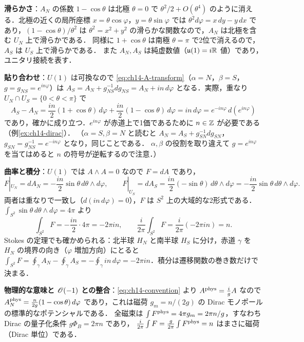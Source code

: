 \textbf{滑らかさ}：$A_N$ の係数 $1-\cos\theta$ は北極 $\theta=0$ で $\theta^2/2+O(\theta^4)$ のように消える．北極の近くの局所座標 $x=\theta\cos\varphi$，$y=\theta\sin\varphi$ では
$\theta^2d\varphi=x\,dy-y\,dx$ であり，$(1-\cos\theta)/\theta^2$ は $\theta^2=x^2+y^2$ の滑らかな関数なので，$A_N$ は北極を含む $U_N$ 上で滑らかである．
同様に $1+\cos\theta$ は南極 $\theta=\pi$ で2位で消えるので，$A_S$ は $U_S$ 上で滑らかである．
また $A_N,A_S$ は純虚数値（$\mathfrak{u}(1)=i\mathbb{R}$ 値）であり，ユニタリ接続を表す．

\textbf{貼り合わせ}：$U(1)$ は可換なので \eqref{eq:ch14-A-transform}（$\alpha=N$，$\beta=S$，$g=g_{NS}=e^{in\varphi}$）は
$A_S=A_N+g_{NS}^{-1}dg_{NS}=A_N+in\,d\varphi$ となる．実際，重なり $U_N\cap U_S=\{0<\theta<\pi\}$ で
\begin{equation*}
  A_S - A_N = \frac{in}{2}(1+\cos\theta)\,d\varphi + \frac{in}{2}(1-\cos\theta)\,d\varphi = in\,d\varphi = e^{-in\varphi}\,d(e^{in\varphi})
\end{equation*}
であり，確かに成り立つ．$e^{in\varphi}$ が赤道上で1価であるために $n\in\mathbb{Z}$ が必要である（例\ref{ex:ch14-dirac}）．
（$\alpha=S,\beta=N$ と読むと $A_N=A_S+g_{SN}^{-1}dg_{SN}$，$g_{SN}=g_{NS}^{-1}=e^{-in\varphi}$ となり，同じことである．
$\alpha,\beta$ の役割を取り違えて $g=e^{in\varphi}$ を当てはめると $n$ の符号が逆転するので注意．）

\textbf{曲率と積分}：$U(1)$ では $A\wedge A=0$ なので $F=dA$ であり，
\begin{equation*}
  F|_{U_N}=dA_N = -\frac{in}{2}\sin\theta\,d\theta\wedge d\varphi,\qquad
  F|_{U_S}=dA_S = \frac{in}{2}(-\sin\theta)\,d\theta\wedge d\varphi = -\frac{in}{2}\sin\theta\,d\theta\wedge d\varphi .
\end{equation*}
両者は重なりで一致し（$d(in\,d\varphi)=0$），$F$ は $S^2$ 上の大域的な2形式である．$\int_{S^2}\sin\theta\,d\theta\wedge d\varphi=4\pi$ より
\begin{equation*}
  \int_{S^2}F = -\frac{in}{2}\cdot4\pi = -2\pi i n,\qquad \frac{i}{2\pi}\int_{S^2}F = \frac{i}{2\pi}(-2\pi in) = n .
\end{equation*}
Stokes の定理でも確かめられる：北半球 $H_N$ と南半球 $H_S$ に分け，赤道 $\gamma$ を $H_N$ の境界の向き（$\varphi$ 増加方向）にとると
$\int_{S^2}F=\oint_\gamma A_N-\oint_\gamma A_S=-\oint_\gamma in\,d\varphi=-2\pi in$．積分は遷移関数の巻き数だけで決まる．

\textbf{物理的な意味と $\mathscr{O}(-1)$ との整合}：\eqref{eq:ch14-convention} より $A^{\rm phys}=\frac{i}{g}A$ なので
$A^{\rm phys}_N=\frac{n}{2g}(1-\cos\theta)\,d\varphi$ であり，これは磁荷 $g_m=n/(2g)$ の Dirac モノポールの標準的なポテンシャルである．
全磁束は $\int F^{\rm phys}=4\pi g_m=2\pi n/g$，すなわち Dirac の量子化条件 $g\Phi_B=2\pi n$ であり，
$\frac{i}{2\pi}\int F=\frac{g}{2\pi}\int F^{\rm phys}=n$ はまさに磁荷（Dirac 単位）である．


